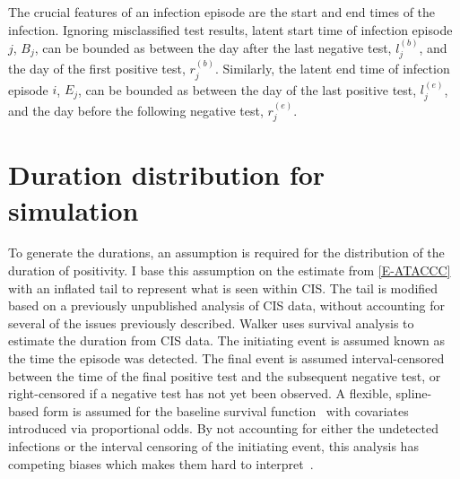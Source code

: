 \documentclass[12pt, letterpaper]{article} %
\begin{document}
The crucial features of an infection episode are the start and end times of the infection.
Ignoring misclassified test results, latent start time of infection episode $j$, $B_j$, can be bounded as between the day after the last negative test, $l_j^{(b)}$, and the day of the first positive test, $r_j^{(b)}$.
Similarly, the latent end time of infection episode $i$, $E_j$, can be bounded as between the day of the last positive test, $l_j^{(e)}$, and the day before the following negative test, $r_j^{(e)}$.

\section{Duration distribution for simulation} \label{duration-ground-truth}

To generate the durations, an assumption is required for the distribution of the duration of positivity.
I base this assumption on the estimate from \cref{E-ATACCC} with an inflated tail to represent what is seen within CIS.
The tail is modified based on a previously unpublished analysis of CIS data, without accounting for several of the issues previously described.
Walker uses survival analysis to estimate the duration from CIS data.
The initiating event is assumed known as the time the episode was detected.
The final event is assumed interval-censored between the time of the final positive test and the subsequent negative test, or right-censored if a negative test has not yet been observed.
A flexible, spline-based form is assumed for the baseline survival function~\autocite{roystonSTPM,roystonFlexible} with covariates introduced via proportional odds.
By not accounting for either the undetected infections or the interval censoring of the initiating event, this analysis has competing biases which makes them hard to interpret~\autocite{cisMethodsONS}.

\end{document}
